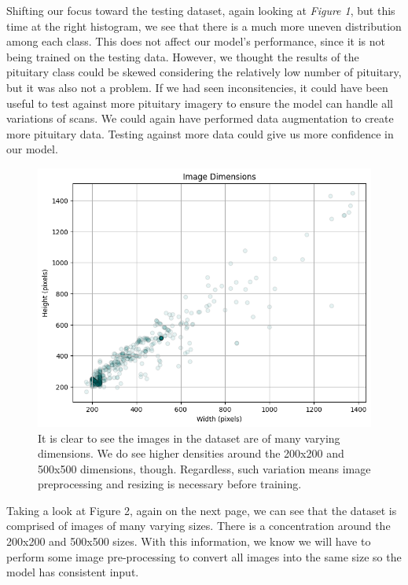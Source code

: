 \documentclass[conference]{IEEEtran}
\begin{document}
Shifting our focus toward the testing dataset, again looking at \textit{Figure 1}, but this time at the right histogram, we see that there is a much more uneven distribution among each class. This does not affect our model's performance, since it is not being trained on the testing data. However, we thought the results of the pituitary class could be skewed considering the relatively low number of pituitary, but it was also not a problem. If we had seen inconsitencies, it could have been useful to test against more pituitary imagery to ensure the model can handle all variations of scans. We could again have performed data augmentation to create more pituitary data. Testing against more data could give us more confidence in our model.

\begin{figure}[!ht]
    \centering
    \includegraphics[width=5in]{ImageDimensions.png}
    \caption{\large It is clear to see the images in the dataset are of many varying dimensions. We do see higher densities around the 200x200 and 500x500 dimensions, though. Regardless, such variation means image preprocessing and resizing is necessary before training.}
    \label{Dimensions of images in the dataset}
\end{figure}

Taking a look at Figure 2, again on the next page, we can see that the dataset is comprised of images of many varying sizes. There is a concentration around the 200x200 and 500x500 sizes. With this information, we know we will have to perform some image pre-processing to convert all images into the same size so the model has consistent input. 
\end{document}
